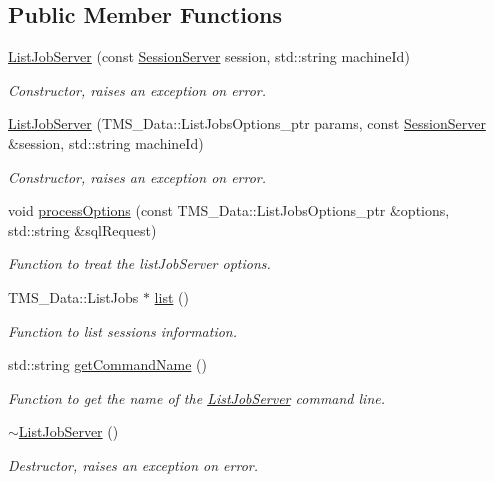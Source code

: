 \subsection*{Public Member Functions}
\begin{DoxyCompactItemize}
\item 
\hyperlink{classListJobServer_aca3cea95317efb694e70d98353ad9e15}{ListJobServer} (const \hyperlink{classSessionServer}{SessionServer} session, std::string machineId)
\begin{DoxyCompactList}\small\item\em Constructor, raises an exception on error. \item\end{DoxyCompactList}\item 
\hyperlink{classListJobServer_a201cfa0d8b9c3fbedc1224a3a5fbeaa5}{ListJobServer} (TMS\_\-Data::ListJobsOptions\_\-ptr params, const \hyperlink{classSessionServer}{SessionServer} \&session, std::string machineId)
\begin{DoxyCompactList}\small\item\em Constructor, raises an exception on error. \item\end{DoxyCompactList}\item 
void \hyperlink{classListJobServer_aee4778e1bc0d87018454dcfb9cd5a915}{processOptions} (const TMS\_\-Data::ListJobsOptions\_\-ptr \&options, std::string \&sqlRequest)
\begin{DoxyCompactList}\small\item\em Function to treat the listJobServer options. \item\end{DoxyCompactList}\item 
TMS\_\-Data::ListJobs $\ast$ \hyperlink{classListJobServer_a88da8c8e36fce6142758dc5779e0adae}{list} ()
\begin{DoxyCompactList}\small\item\em Function to list sessions information. \item\end{DoxyCompactList}\item 
std::string \hyperlink{classListJobServer_ae4efce66451934990d0575d1b8151378}{getCommandName} ()
\begin{DoxyCompactList}\small\item\em Function to get the name of the \hyperlink{classListJobServer}{ListJobServer} command line. \item\end{DoxyCompactList}\item 
\hypertarget{classListJobServer_abf137539e02fc0d6f0d288d1b76cd58b}{
\hyperlink{classListJobServer_abf137539e02fc0d6f0d288d1b76cd58b}{$\sim$ListJobServer} ()}
\label{classListJobServer_abf137539e02fc0d6f0d288d1b76cd58b}

\begin{DoxyCompactList}\small\item\em Destructor, raises an exception on error. \item\end{DoxyCompactList}\end{DoxyCompactItemize}
